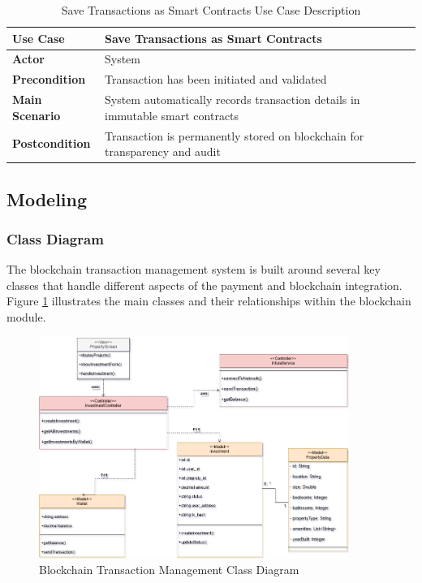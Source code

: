 \begin{table}[htbp]
    \centering
    \begin{tabular}{|p{3cm}|p{10cm}|}
        \hline
        \textbf{Use Case} & \textbf{Save Transactions as Smart Contracts} \\
        \hline
        \textbf{Actor} & System \\
        \hline
        \textbf{Precondition} & Transaction has been initiated and validated \\
        \hline
        \textbf{Main Scenario} & System automatically records transaction details in immutable smart contracts \\
        \hline
        \textbf{Postcondition} & Transaction is permanently stored on blockchain for transparency and audit \\
        \hline
    \end{tabular}
    \caption{Save Transactions as Smart Contracts Use Case Description}
    \label{tab:save-transactions-use-case}
\end{table}

\subsection{Modeling}

\subsubsection{Class Diagram}

The blockchain transaction management system is built around several key classes that handle different aspects of the payment and blockchain integration. Figure \ref{fig:blockchain-class-diagram} illustrates the main classes and their relationships within the blockchain module.
\newpage
\begin{figure}[htbp]
    \centering
    \includegraphics[width=0.9\textwidth]{images/blockchain_class_diagram.png}
    \caption{Blockchain Transaction Management Class Diagram}
    \label{fig:blockchain-class-diagram}
\end{figure}


